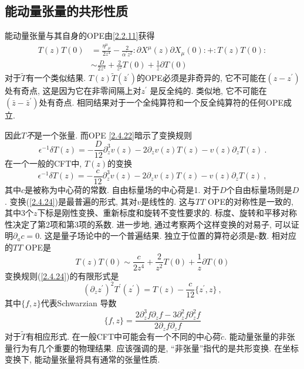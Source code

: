 \subsection*{能动量张量的共形性质}
能动量张量与其自身的OPE由\eqref{2.2.11}获得
\begin{equation}\label{2.4.22}
\begin{aligned}
T(z) T(0) &=\frac{\eta^{\mu}{}_{\mu}}{2 z^{4}}-\frac{2}{\alpha^{\prime} z^{2}}: \mathrel{\partial X^{\mu}(z) \partial X_{\mu}(0)}:+ 
: \mathrel{T(z) T(0)}: \\
& \sim \frac{D}{2 z^{4}}+\frac{2}{z^{2}} T(0)+\frac{1}{z} \partial T(0)
\end{aligned}
\end{equation}
对于$\tilde{T}$有一个类似结果. 
$T(z) \tilde{T}(\bar{z}^{\prime})$的OPE必须是非奇异的, 它不可能在$(z-z^{\prime})$处有奇点, 这是因为它在非零间隔上对$z^{\prime}$ 是反全纯的. 类似地, 它不可能在$(\bar{z}-\bar{z}^{\prime})$处有奇点. 相同结果对于一个全纯算符和一个反全纯算符的任何OPE成立. 

因此$T$\emph{不}是一个张量. 而OPE \eqref{2.4.22}暗示了变换规则
\begin{equation}
\epsilon^{-1} \delta T(z)=-\frac{D}{12} \partial_{z}^{3} v(z)-2 \partial_{z} v(z) T(z)-v(z) \partial_{z} T(z) \:. \label{2.4.23}
\end{equation}
在一个一般的CFT中,  $T(z)$的变换
\begin{equation}\label{2.4.24}
\epsilon^{-1} \delta T(z)=-\frac{c}{12} \partial_{z}^{3} v(z)-2 \partial_{z} v(z) T(z)-v(z) \partial_{z} T(z) \:,
\end{equation}
其中$c$是被称为中心荷的常数. 自由标量场的中心荷是1. 对于$D$个自由标量场则是$D$. 变换(\ref{2.4.24})是最普遍的形式, 其对$v$是线性的. 这与$TT$ OPE的对称性是一致的, 其中3个$z$下标是刚性变换、重新标度和旋转不变性要求的. 标度、旋转和平移对称性决定了第2项和第3项的系数. 进一步地, 通过考察两个这样变换的对易子, 可以证明$\partial_{a} c=0$. 这是量子场论中的一个普遍结果. 独立于位置的算符必须是c数. 相对应的$TT$ OPE是
\begin{equation}\label{2.4.25}
T(z) T(0) \sim \frac{c}{2 z^{4}}+\frac{2}{z^{2}} T(0)+\frac{1}{z} \partial T(0)
\end{equation}
变换规则(\ref{2.4.24})的有限形式是
\begin{equation}\label{2.4.26}
(\partial_{z} z^{\prime})^{2} T^{\prime}(z^{\prime})=T(z)-\frac{c}{12}\{z^{\prime}, z\} \:,
\end{equation}
其中$\{f,z\}$代表Schwarzian 导数
\begin{equation}
\{f, z\}=\frac{2 \partial_{z}^{3} f \partial_{z} f-3 \partial_{z}^{2} f \partial_{z}^{2} f}{2 \partial_{z} f \partial_{z} f}
\end{equation}
对于$\tilde{T}$有相应形式. 在一般CFT中可能会有一个不同的中心荷$\tilde{c}$.
能动量张量的非张量行为有几个重要的物理结果. 应该强调的是, ``非张量''指代的是共形变换. 在坐标变换下, 能动量张量将具有通常的张量性质.

